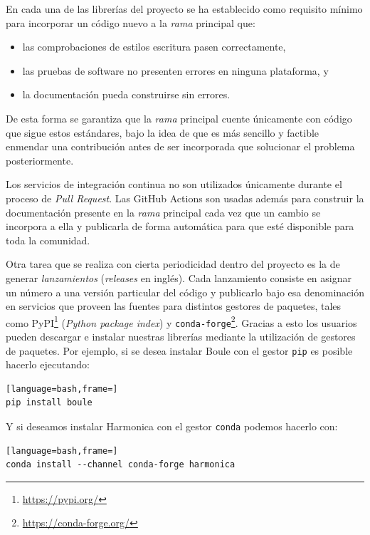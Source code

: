 En cada una de las librerías del proyecto se ha establecido como requisito
mínimo para incorporar un código nuevo a la \emph{rama} principal que:

\begin{itemize}
    \item las comprobaciones de estilos escritura pasen correctamente,
    \item las pruebas de software no presenten errores en ninguna plataforma, y
    \item la documentación pueda construirse sin errores.
\end{itemize}

De esta forma se garantiza que la \emph{rama} principal cuente únicamente con
código que sigue estos estándares, bajo la idea de que es más sencillo
y factible enmendar una contribución antes de ser incorporada que solucionar el
problema posteriormente.

Los servicios de integración continua no son utilizados únicamente durante el
proceso de \emph{Pull Request}.
Las GitHub Actions son usadas además para construir la documentación presente
en la \emph{rama} principal cada vez que un cambio se incorpora a ella
y publicarla de forma automática para que esté disponible para toda la
comunidad.

Otra tarea que se realiza con cierta periodicidad dentro del proyecto es la de
generar \emph{lanzamientos} (\emph{releases} en inglés).
Cada lanzamiento consiste en asignar un número a una versión particular del
código y publicarlo bajo esa denominación en servicios que proveen las fuentes
para distintos gestores de paquetes, tales como
PyPI\footnote{\url{https://pypi.org/}} (\emph{Python package index})
y \texttt{conda-forge}\footnote{\url{https://conda-forge.org/}}.
Gracias a esto los usuarios pueden descargar e instalar nuestras librerías
mediante la utilización de gestores de paquetes.
Por ejemplo, si se desea instalar Boule con el gestor \texttt{pip} es posible
hacerlo ejecutando:

\begin{lstlisting}[language=bash,frame=]
pip install boule
\end{lstlisting}

\noindent Y si deseamos instalar Harmonica con el gestor \texttt{conda} podemos
hacerlo con:

\begin{lstlisting}[language=bash,frame=]
conda install --channel conda-forge harmonica
\end{lstlisting}

